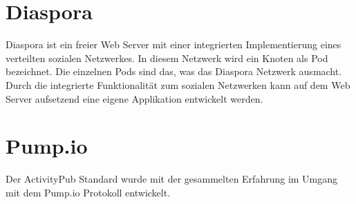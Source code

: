 \section{Diaspora}
\label{sub:diaspora}
Diaspora ist ein freier Web Server mit einer integrierten Implementierung eines verteilten sozialen Netzwerkes. In diesem Netzwerk wird ein Knoten als Pod bezeichnet. Die einzelnen Pods sind das, was das Diaspora Netzwerk ausmacht. Durch die integrierte Funktionalität zum sozialen Netzwerken kann auf dem Web Server aufsetzend eine eigene Applikation entwickelt werden.~\\
\section{Pump.io}
\label{sub:pumpio}
Der ActivityPub Standard wurde mit der gesammelten Erfahrung im Umgang mit dem Pump.io Protokoll entwickelt.~\\